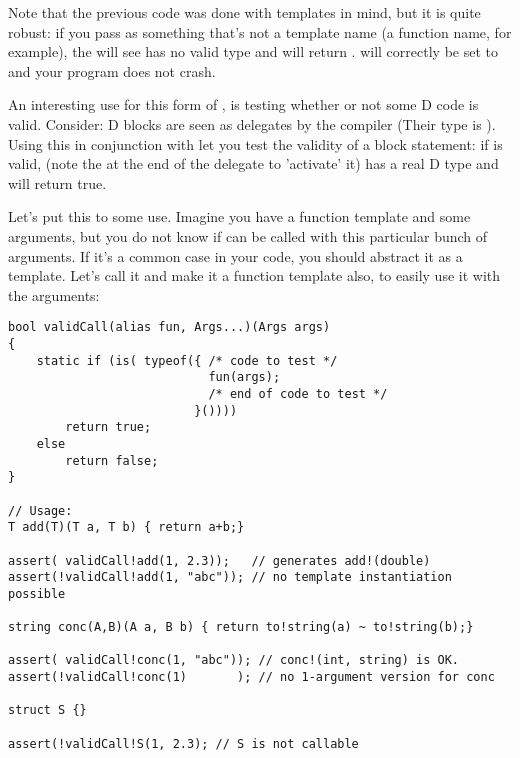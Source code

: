 Note that the previous code was done with templates in mind, but it is quite robust: if you pass as  something that's not a template name (a func\-tion name, for ex\-am\-ple), the  will see  has no valid type and will return .   will cor\-rec\-tly be set to  and your program does not crash.


An interesting use for this form of , is testing whether or not some D code is valid. Consider: D blocks are seen as delegates by the compiler (Their type is \DD{()}). Using this in conjunction with  let you test the validity of a block statement: if  is valid,  (note the \DD{()} at the end of the delegate to 'activate' it) has a real D type and  will return true.

Let's put this to some use. Imagine you have a function template  and some arguments, but you do not know if  can be called with this particular bunch of arguments. If it's a common case in your code, you should abstract it as a template. Let's call it  and make it a function template also, to easily use it with the arguments:

\begin{verbatim}
bool validCall(alias fun, Args...)(Args args) 
{
    static if (is( typeof({ /* code to test */
                            fun(args);
                            /* end of code to test */
                          }())))
        return true;
    else
        return false;
}

// Usage:
T add(T)(T a, T b) { return a+b;}

assert( validCall!add(1, 2.3));   // generates add!(double)
assert(!validCall!add(1, "abc")); // no template instantiation possible

string conc(A,B)(A a, B b) { return to!string(a) ~ to!string(b);}

assert( validCall!conc(1, "abc")); // conc!(int, string) is OK.
assert(!validCall!conc(1)       ); // no 1-argument version for conc

struct S {}

assert(!validCall!S(1, 2.3); // S is not callable
\end{verbatim}

